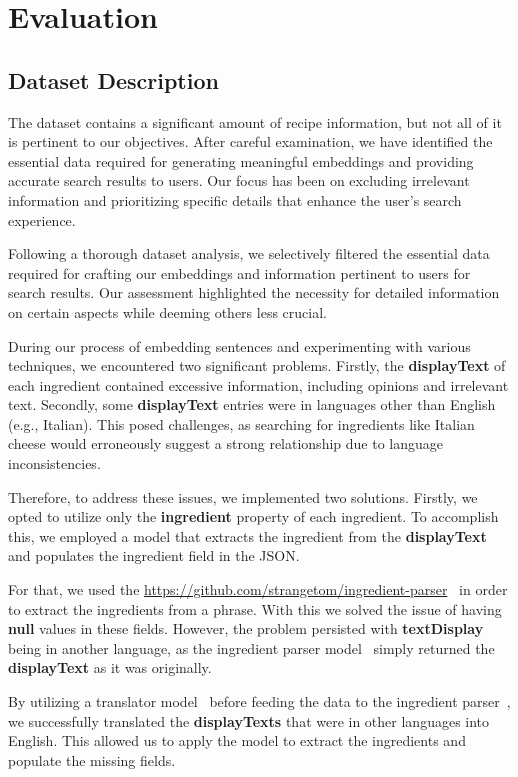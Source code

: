 \documentclass[runningheads]{llncs}
\begin{document}
\section{Evaluation}
\subsection{Dataset Description}
The dataset contains a significant amount of recipe information, but not all of it is pertinent to our objectives. After careful examination, we have identified the essential data required for generating meaningful embeddings and providing accurate search results to users. Our focus has been on excluding irrelevant information and prioritizing specific details that enhance the user's search experience.

Following a thorough dataset analysis, we selectively filtered the essential data required for crafting our embeddings and information pertinent to users for search results. Our assessment highlighted the necessity for detailed information on certain aspects while deeming others less crucial.

During our process of embedding sentences and experimenting with various techniques, we encountered two significant problems. Firstly, the \textbf{displayText} of each ingredient contained excessive information, including opinions and irrelevant text. Secondly, some \textbf{displayText} entries were in languages other than English (e.g., Italian). This posed challenges, as searching for ingredients like Italian cheese would erroneously suggest a strong relationship due to language inconsistencies.

Therefore, to address these issues, we implemented two solutions. Firstly, we opted to utilize only the \textbf{ingredient} property of each ingredient. To accomplish this, we employed a model that extracts the ingredient from the \textbf{displayText} and populates the ingredient field in the JSON.

For that, we used the \url{https://github.com/strangetom/ingredient-parser}~\cite{ingredientParser} in order to extract the ingredients from a phrase. With this we solved the issue of having \textbf{null} values in these fields. However, the problem persisted with \textbf{textDisplay} being in another language, as the ingredient parser model~\cite{ingredientParser} simply returned the \textbf{displayText} as it was originally.

By utilizing a translator model~\cite{deeptranslate} before feeding the data to the ingredient parser~\cite{ingredientParser}, we successfully translated the \textbf{displayTexts} that were in other languages into English. This allowed us to apply the model to extract the ingredients and populate the missing fields.
\end{document}
